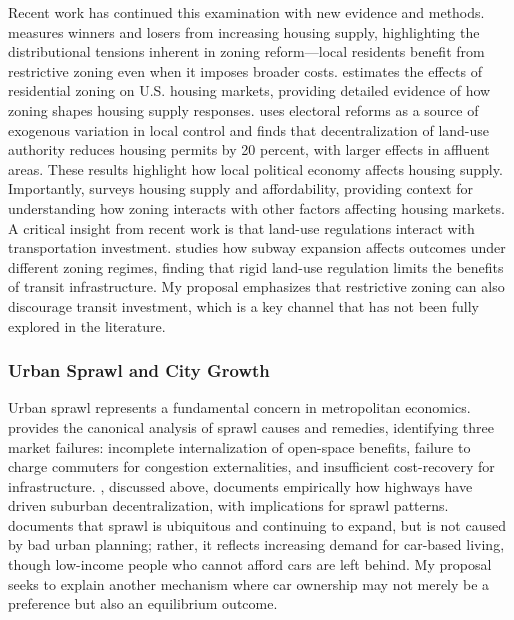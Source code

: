 \documentclass[12pt, a4paper]{article}
\begin{document}
Recent work has continued this examination with new evidence and methods. \citet{Rollet2025-mk} measures winners and losers from increasing housing supply, highlighting the distributional tensions inherent in zoning reform---local residents benefit from restrictive zoning even when it imposes broader costs. \citet{Song2025-ft} estimates the effects of residential zoning on U.S. housing markets, providing detailed evidence of how zoning shapes housing supply responses. \citet{Mast2024-zi} uses electoral reforms as a source of exogenous variation in local control and finds that decentralization of land-use authority reduces housing permits by 20 percent, with larger effects in affluent areas. These results highlight how local political economy affects housing supply. Importantly, \citet{Baum-Snow2025-ml} surveys housing supply and affordability, providing context for understanding how zoning interacts with other factors affecting housing markets. A critical insight from recent work is that land-use regulations interact with transportation investment. \citet{Hu2025-hj} studies how subway expansion affects outcomes under different zoning regimes, finding that rigid land-use regulation limits the benefits of transit infrastructure. My proposal emphasizes that restrictive zoning can also discourage transit investment, which is a key channel that has not been fully explored in the literature.

\subsubsection{Urban Sprawl and City Growth}

Urban sprawl represents a fundamental concern in metropolitan economics. \citet{Brueckner2000-vd} provides the canonical analysis of sprawl causes and remedies, identifying three market failures: incomplete internalization of open-space benefits, failure to charge commuters for congestion externalities, and insufficient cost-recovery for infrastructure. \citet{Baum-Snow2007-zj}, discussed above, documents empirically how highways have driven suburban decentralization, with implications for sprawl patterns. \citet{Glaeser2003-sr} documents that sprawl is ubiquitous and continuing to expand, but is not caused by bad urban planning; rather, it reflects increasing demand for car-based living, though low-income people who cannot afford cars are left behind. My proposal seeks to explain another mechanism where car ownership may not merely be a preference but also an equilibrium outcome.
\end{document}
